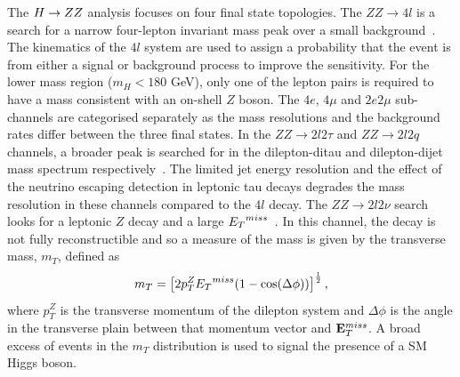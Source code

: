 The $H\rightarrow ZZ$ analysis focuses on four final state topologies.
The $ZZ\rightarrow 4l$ is a search for a narrow four-lepton invariant mass 
peak over a small background~\citep{HIG-12-016}. The kinematics of the $4l$ system are used
to assign a probability that the event is from either a signal or background 
process to improve the sensitivity. For the lower mass region ($m_{H}<180$ GeV),
only one of the lepton pairs is required to have a mass consistent with an 
on-shell $Z$ boson.
The $4e$, $4\mu$ and $2e2\mu$ sub-channels are categorised separately as the 
mass resolutions and the background rates differ between the three 
final states. In the $ZZ\rightarrow 2l2\tau$ and $ZZ\rightarrow 2l2q$ channels, 
a broader peak is searched for in the dilepton-ditau and dilepton-dijet
mass spectrum respectively~\citep{HIG-12-016,HIG-11-027}. 
The limited jet energy resolution
and the effect of the neutrino escaping detection in leptonic tau decays
degrades the mass resolution in these channels compared to the $4l$ decay.
The $ZZ\rightarrow 2l2\nu$ search looks for a leptonic $Z$ decay
and a large ${E_{T}}^{miss}$~\citep{HIG-12-023}.
In this channel, the decay is not fully reconstructible and so a measure of the mass
is given by the transverse mass, $m_{T}$, defined as
\begin{equation}
m_{T} = \left[2 p_{T}^{Z}{E_{T}}^{miss}(1-\cos(\Delta\phi))\right]^{\frac{1}{2}},
\end{equation}
where $p_{T}^{Z}$ is the transverse momentum of the dilepton system and 
$\Delta\phi$ is the angle in the transverse plain between that momentum vector and 
${\mathbf{E}^{miss}_{T}}$.
A broad excess of events in the $m_{T}$ distribution is used to signal the presence 
of a SM Higgs boson.


